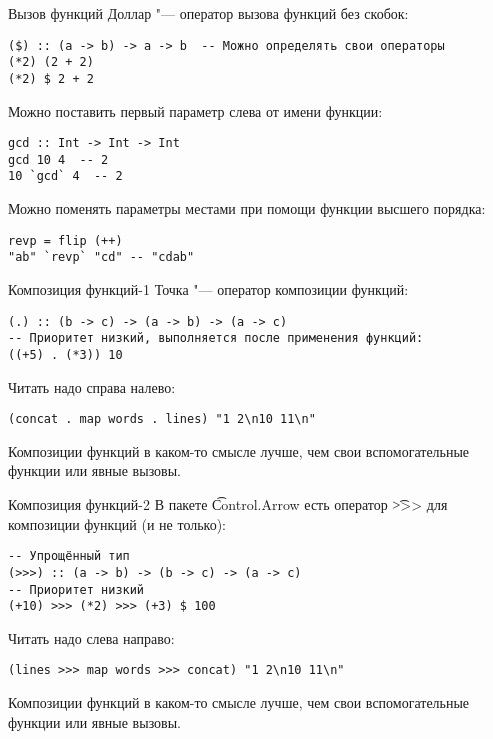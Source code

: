 \begin{frame}[fragile]{Вызов функций}
	Доллар "--- оператор вызова функций без скобок:
\begin{verbatim}
($) :: (a -> b) -> a -> b  -- Можно определять свои операторы
(*2) (2 + 2)
(*2) $ 2 + 2
\end{verbatim}

	Можно поставить первый параметр слева от имени функции:
\begin{verbatim}
gcd :: Int -> Int -> Int
gcd 10 4  -- 2
10 `gcd` 4  -- 2
\end{verbatim}

	Можно поменять параметры местами при помощи функции высшего порядка:
\begin{verbatim}
revp = flip (++)
"ab" `revp` "cd" -- "cdab"
\end{verbatim}
\end{frame}

\begin{frame}[fragile]{Композиция функций-1}
	Точка "--- оператор композиции функций:
\begin{verbatim}
(.) :: (b -> c) -> (a -> b) -> (a -> c)
-- Приоритет низкий, выполняется после применения функций:
((+5) . (*3)) 10
\end{verbatim}
	Читать надо справа налево:
\begin{verbatim}
(concat . map words . lines) "1 2\n10 11\n"
\end{verbatim}
	Композиции функций в каком-то смысле лучше, чем свои вспомогательные функции или явные вызовы.
\end{frame}

\begin{frame}[fragile]{Композиция функций-2}
	В пакете \t{Control.Arrow} есть оператор \t{>>>} для композиции функций (и не только):
\begin{verbatim}
-- Упрощённый тип
(>>>) :: (a -> b) -> (b -> c) -> (a -> c)
-- Приоритет низкий
(+10) >>> (*2) >>> (+3) $ 100
\end{verbatim}
	Читать надо слева направо:
\begin{verbatim}
(lines >>> map words >>> concat) "1 2\n10 11\n"
\end{verbatim}
	Композиции функций в каком-то смысле лучше, чем свои вспомогательные функции или явные вызовы.
\end{frame}
